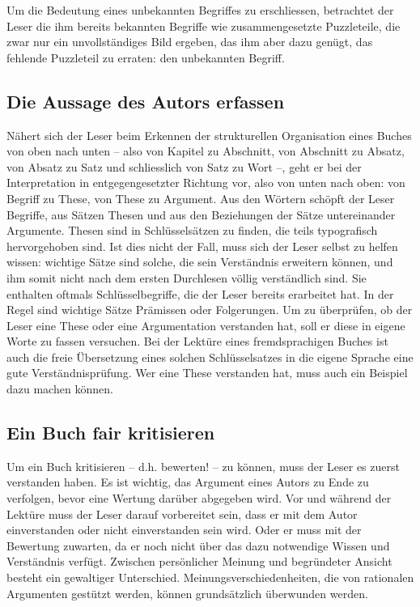 \documentclass[a4paper,12pt]{scrartcl}
\begin{document}
Um die Bedeutung eines unbekannten Begriffes zu erschliessen, betrachtet der Leser die ihm bereits bekannten Begriffe wie zusammengesetzte Puzzleteile, die zwar nur ein unvollständiges Bild ergeben, das ihm aber dazu genügt, das fehlende Puzzleteil zu erraten: den unbekannten Begriff.

\subsection{Die Aussage des Autors erfassen}

Nähert sich der Leser beim Erkennen der strukturellen Organisation eines Buches von oben nach unten – also von Kapitel zu Abschnitt, von Abschnitt zu Absatz, von Absatz zu Satz und schliesslich von Satz zu Wort –, geht er bei der Interpretation in entgegengesetzter Richtung vor, also von unten nach oben: von Begriff zu These, von These zu Argument. Aus den Wörtern schöpft der Leser Begriffe, aus Sätzen Thesen und aus den Beziehungen der Sätze untereinander Argumente. Thesen sind in Schlüsselsätzen zu finden, die teils typografisch hervorgehoben sind. Ist dies nicht der Fall, muss sich der Leser selbst zu helfen wissen: wichtige Sätze sind solche, die sein Verständnis erweitern können, und ihm somit nicht nach dem ersten Durchlesen völlig verständlich sind. Sie enthalten oftmals Schlüsselbegriffe, die der Leser bereits erarbeitet hat. In der Regel sind wichtige Sätze Prämissen oder Folgerungen. Um zu überprüfen, ob der Leser eine These oder eine Argumentation verstanden hat, soll er diese in eigene Worte zu fassen versuchen. Bei der Lektüre eines fremdsprachigen Buches ist auch die freie Übersetzung eines solchen Schlüsselsatzes in die eigene Sprache eine gute Verständnisprüfung. Wer eine These verstanden hat, muss auch ein Beispiel dazu machen können.

\subsection{Ein Buch fair kritisieren}

Um ein Buch kritisieren – d.h. bewerten! – zu können, muss der Leser es zuerst verstanden haben. Es ist wichtig, das Argument eines Autors zu Ende zu verfolgen, bevor eine Wertung darüber abgegeben wird. Vor und während der Lektüre muss der Leser darauf vorbereitet sein, dass er mit dem Autor einverstanden oder nicht einverstanden sein wird. Oder er muss mit der Bewertung zuwarten, da er noch nicht über das dazu notwendige Wissen und Verständnis verfügt. Zwischen persönlicher Meinung und begründeter Ansicht besteht ein gewaltiger Unterschied. Meinungsverschiedenheiten, die von rationalen Argumenten gestützt werden, können grundsätzlich überwunden werden.
\end{document}
